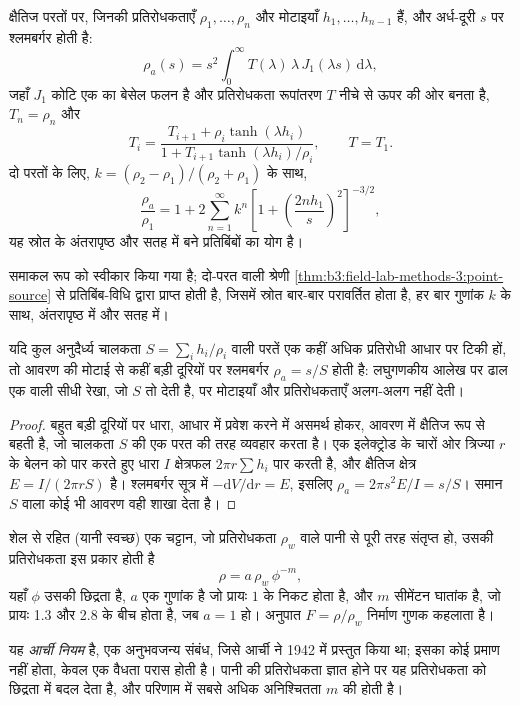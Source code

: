 \begin{proposition}\label{prop:b3:field-lab-methods-3:layers}
क्षैतिज परतों पर, जिनकी प्रतिरोधकताएँ $\rho_1, \dots, \rho_n$ और
मोटाइयाँ $h_1, \dots, h_{n-1}$ हैं, और अर्ध-दूरी $s$ पर श्लमबर्गर  होती है:
\[
\rho_a(s) = s^2\int_0^\infty T(\lambda)\,\lambda\,J_1(\lambda s)\,\mathrm{d}\lambda ,
\]
जहाँ $J_1$ कोटि एक का बेसेल फलन है और प्रतिरोधकता रूपांतरण
$T$ नीचे से ऊपर की ओर बनता है, $T_n = \rho_n$ और
\[
T_i = \frac{T_{i+1} + \rho_i\tanh(\lambda h_i)}{1 + T_{i+1}\tanh(\lambda h_i)/\rho_i} ,
\qquad T = T_1 .
\]
दो परतों के लिए, $k = (\rho_2 - \rho_1)/(\rho_2 + \rho_1)$ के साथ,
\[
\frac{\rho_a}{\rho_1} = 1 + 2\sum_{n=1}^{\infty} k^n
  \left[1 + \left(\frac{2nh_1}{s}\right)^2\right]^{-3/2} ,
\]
यह स्रोत के अंतरापृष्ठ और सतह में बने प्रतिबिंबों का योग है।
\end{proposition}
समाकल रूप को स्वीकार किया गया है; दो-परत वाली श्रेणी
\cref{thm:b3:field-lab-methods-3:point-source} से प्रतिबिंब-विधि द्वारा प्राप्त होती है,
जिसमें स्रोत बार-बार परावर्तित होता है, हर बार गुणांक $k$ के साथ,
अंतरापृष्ठ में और सतह में।

\begin{proposition}[एक सुचालक आवरण, अचालक आधार पर]\label{prop:b3:field-lab-methods-3:conductance}
यदि कुल अनुदैर्ध्य चालकता $S = \sum_i h_i/\rho_i$ वाली परतें
एक कहीं अधिक प्रतिरोधी आधार पर टिकी हों, तो आवरण की मोटाई से
कहीं बड़ी दूरियों पर श्लमबर्गर  $\rho_a = s/S$ होती है: लघुगणकीय आलेख पर
ढाल एक वाली सीधी रेखा, जो $S$ तो देती है, पर
मोटाइयाँ और प्रतिरोधकताएँ अलग-अलग नहीं देती।
\end{proposition}

\begin{proof}
बहुत बड़ी दूरियों पर धारा, आधार में प्रवेश करने में असमर्थ होकर,
आवरण में क्षैतिज रूप से बहती है, जो
चालकता $S$ की एक परत की तरह व्यवहार करता है। एक इलेक्ट्रोड के चारों ओर त्रिज्या $r$ के बेलन को पार करते हुए
धारा $I$ क्षेत्रफल $2\pi r\sum h_i$ पार करती है, और क्षैतिज क्षेत्र
$E = I/(2\pi rS)$ है। श्लमबर्गर सूत्र में $-\mathrm{d}V/
\mathrm{d}r = E$, इसलिए $\rho_a = 2\pi s^2 E/I = s/S$। समान
$S$ वाला कोई भी आवरण वही शाखा देता है।
\end{proof}

\begin{proposition}[आर्ची नियम]\label{prop:b3:field-lab-methods-3:archie}
शेल से रहित (यानी स्वच्छ) एक चट्टान, जो
प्रतिरोधकता $\rho_w$ वाले पानी से पूरी तरह संतृप्त हो, उसकी प्रतिरोधकता इस प्रकार होती है
\[
\rho = a\,\rho_w\,\phi^{-m} ,
\]
यहाँ $\phi$ उसकी छिद्रता है, $a$ एक गुणांक है जो प्रायः $1$ के निकट होता है,
और $m$ सीमेंटन घातांक है, जो प्रायः \num{1.3} और
\num{2.8} के बीच होता है, जब $a = 1$ हो। अनुपात $F = \rho/\rho_w$ निर्माण
गुणक कहलाता है।
\end{proposition}
यह \emph{आर्ची नियम} है, एक अनुभवजन्य संबंध, जिसे
आर्ची ने 1942 में प्रस्तुत किया था; इसका कोई प्रमाण नहीं होता, केवल एक वैधता परास होती है। पानी की प्रतिरोधकता ज्ञात होने पर यह
प्रतिरोधकता को छिद्रता में बदल देता है, और परिणाम में सबसे अधिक अनिश्चितता $m$ की होती है।

